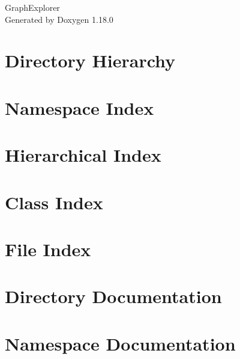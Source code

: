 \documentclass[twoside]{book}
\newcommand{\+}{\discretionary{\mbox{\scriptsize$\hookleftarrow$}}{}{}}
\newcommand{\clearemptydoublepage}{%
    \newpage{\pagestyle{empty}\cleardoublepage}%
  }
\begin{document}
  \raggedbottom
    \hypersetup{pageanchor=false,
                bookmarksnumbered=true,
                pdfencoding=unicode
               }
  \begin{titlepage}
  \vspace*{7cm}
  \begin{center}%
  {\Large Graph\+Explorer}\\
  \vspace*{1cm}
  {\large Generated by Doxygen 1.18.0}\\
  \end{center}
  \end{titlepage}
  \clearemptydoublepage
  \tableofcontents
  \clearemptydoublepage
  \hypersetup{pageanchor=true}




\chapter{Directory Hierarchy}

\chapter{Namespace Index}

\chapter{Hierarchical Index}

\chapter{Class Index}

\chapter{File Index}

\chapter{Directory Documentation}

\chapter{Namespace Documentation}






\end{document}
